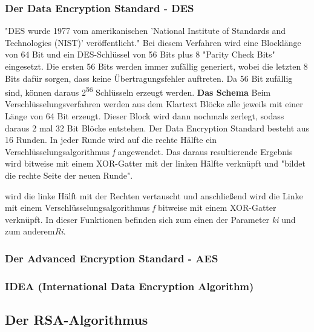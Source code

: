 \documentclass[11pt]{scrartcl}
\begin{document}
\subsubsection{Der Data Encryption Standard - DES}
\label{sec:data-encryotion-standard}
"DES wurde 1977 vom amerikanischen 'National Institute of Standards and Technologies (NIST)' veröffentlicht."\cite{1} Bei diesem Verfahren wird eine Blocklänge von 64 Bit und ein DES-Schlüssel von 56 Bits plus 8 "Parity Check Bits"\cite{1} eingesetzt. Die ersten 56 Bits werden immer zufällig generiert, wobei die letzten 8 Bits dafür sorgen, dass keine Übertragungsfehler auftreten. Da 56 Bit zufällig sind, können daraus 2\textsuperscript{56} Schlüsseln erzeugt werden.
\textbf{Das Schema}
Beim Verschlüsselungsverfahren werden aus dem Klartext Blöcke alle jeweils mit einer Länge von 64 Bit erzeugt. Dieser Block wird dann nochmals zerlegt, sodass daraus 2 mal 32 Bit Blöcke entstehen. Der Data Encryption Standard besteht aus 16 Runden. In jeder Runde wird auf die rechte Hälfte ein Verschlüsselungsalgorithmus \textit{f} angewendet. Das daraus resultierende Ergebnis wird bitweise mit einem XOR-Gatter mit der linken Hälfte verknüpft und "bildet die rechte Seite der neuen Runde"\cite{2}.

wird die linke Hälft mit der Rechten vertauscht und anschließend wird die Linke mit einem Verschlüsselungsalgorithmus \textit{f} bitweise mit einem XOR-Gatter  verknüpft. In dieser Funktionen befinden sich zum einen der Parameter \textit{k{\footnotesize i}} und zum anderem\textit{R{\footnotesize i}}. 

\subsubsection{Der Advanced Encryption Standard - AES}
\label{sec:advanced-encryotion-standard}

\subsubsection{IDEA (International Data Encryption Algorithm)}
\label{sec:international-data-encryption-algorithm}

\subsection{Der RSA-Algorithmus}
\label{sec:rsa-algorithmus}
\end{document}
